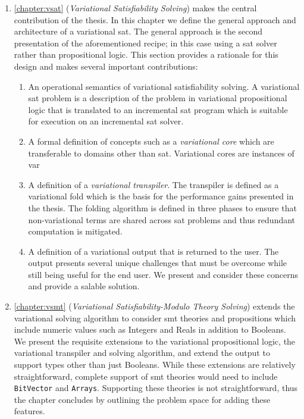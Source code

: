 \begin{enumerate}
  \item \autoref{chapter:vsat} (\emph{Variational Satisfiability Solving}) makes
    the central contribution of the thesis. In this chapter we define the
    general approach and architecture of a variational \acl{sat}. The general
    approach is the second presentation of the aforementioned recipe; in this
    case using a \ac{sat} solver rather than propositional logic. This section
    provides a rationale for this design and makes several important
    contributions:
    \begin{enumerate}
    \item An operational semantics of variational satisfiability solving. A
      variational \ac{sat} problem is a description of the problem in
      variational propositional logic that is translated to an incremental
      \ac{sat} program which is suitable for execution on an incremental
      \ac{sat} solver.
    \item A formal definition of concepts such as a \emph{variational core}
      which are transferable to domains other than \ac{sat}. Variational cores
      are instances of var
    \item A definition of a \emph{variational transpiler}. The transpiler is
      defined as a variational fold which is the basis for the performance gains
      presented in the thesis. The folding algorithm is defined in three phases
      to ensure that non-variational terms are shared across \ac{sat} problems
      and thus redundant computation is mitigated.
    \item A definition of a variational output that is returned to the user. The
      output presents several unique challenges that must be overcome while
      still being useful for the end user. We present and consider these
      concerns and provide a salable solution.
    \end{enumerate}

  \item \autoref{chapter:vsmt} (\emph{Variational Satisfiability-Modulo Theory
      Solving}) extends the variational solving algorithm to consider \ac{smt}
    theories and propositions which include numeric values such as Integers and
    Reals in addition to Booleans. We present the requisite extensions to the
    variational propositional logic, the variational transpiler and solving
    algorithm, and extend the output to support types other than just Booleans.
    While these extensions are relatively straightforward, complete support of
    \ac{smt} theories would need to include \texttt{BitVector} and
    \texttt{Arrays}. Supporting these theories is not straightforward, thus the
    chapter concludes by outlining the problem space for adding these features.


\end{enumerate}
